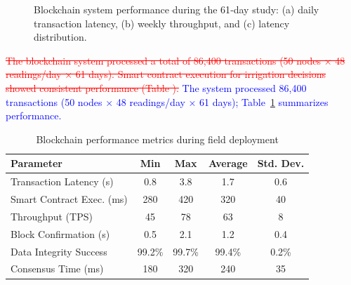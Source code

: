 \documentclass[pdflatex,sn-mathphys-num]{sn-jnl}
\theoremstyle{thmstyleone}
\theoremstyle{thmstyletwo}
\theoremstyle{thmstylethree}
\begin{document}
{\begin{figure}[!htbp]
\begin{subfigure}[b]{0.45\linewidth}
\label{subfig:distribution}
\label{fig:latency_distribution}
\end{subfigure}
\caption{Blockchain system performance during the 61‑day study: (a) daily transaction latency, (b) weekly throughput, and (c) latency distribution.}
\label{fig:blockchain_performance_2025}
\end{figure}

\textcolor{red}{\sout{The blockchain system processed a total of 86,400 transactions (50 nodes × 48 readings/day × 61 days). Smart contract execution for irrigation decisions showed consistent performance (Table ).}}
\textcolor{blue}{The system processed 86,400 transactions (50 nodes × 48 readings/day × 61 days); Table~\ref{tab:blockchain_detailed} summarizes performance.}

\begin{table}[htbp]
\centering
\caption{Blockchain performance metrics during field deployment}
\label{tab:blockchain_detailed}
\footnotesize
\setlength{\tabcolsep}{3.5pt}
\begin{tabular}{lcccc}
\toprule
\textbf{Parameter} & \textbf{Min} & \textbf{Max} & \textbf{Average} & \textbf{Std. Dev.} \\
\midrule
Transaction Latency (s) & 0.8 & 3.8 & 1.7 & 0.6 \\
Smart Contract Exec. (ms) & 280 & 420 & 320 & 40 \\
Throughput (TPS) & 45 & 78 & 63 & 8 \\
Block Confirmation (s) & 0.5 & 2.1 & 1.2 & 0.4 \\
Data Integrity Success & 99.2\% & 99.7\% & 99.4\% & 0.2\% \\
Consensus Time (ms) & 180 & 320 & 240 & 35 \\
\bottomrule
\end{tabular}
\end{table}

}
\end{document}

